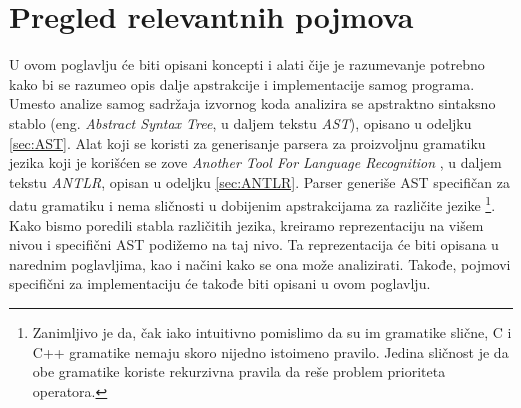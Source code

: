 \chapter{Pregled relevantnih pojmova}
\label{chp:RelevantTerms}

U ovom poglavlju će biti opisani koncepti i alati čije je razumevanje
potrebno kako bi se razumeo opis dalje apstrakcije i implementacije 
samog programa. Umesto analize samog sadržaja izvornog koda analizira
se apstraktno sintaksno stablo (eng. \emph{Abstract Syntax Tree}, u 
daljem tekstu \emph{AST}), opisano u odeljku \ref{sec:AST}.
Alat koji se koristi za generisanje parsera za proizvoljnu gramatiku jezika 
koji je korišćen se zove \emph{Another Tool For Language Recognition} 
\cite{ANTLR}, u daljem tekstu \emph{ANTLR}, opisan u odeljku \ref{sec:ANTLR}.
Parser generiše AST specifičan za datu gramatiku i nema sličnosti u 
dobijenim apstrakcijama za različite jezike \footnote{Zanimljivo je da, 
čak iako intuitivno pomislimo da su im gramatike slične, C i C++ gramatike
nemaju skoro nijedno istoimeno pravilo. Jedina sličnost je da obe gramatike 
koriste rekurzivna pravila da reše problem prioriteta operatora.}.
Kako bismo poredili stabla različitih jezika, kreiramo reprezentaciju na 
višem nivou i specifični AST podižemo na taj nivo. Ta reprezentacija će
biti opisana u narednim poglavljima, kao i načini kako se ona može
analizirati. Takođe, pojmovi specifični za implementaciju će takođe biti
opisani u ovom poglavlju.




